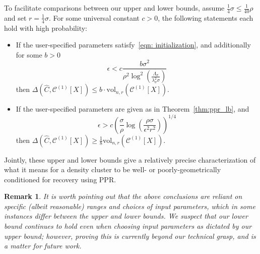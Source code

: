 \documentclass[11pt,twoside]{article}
\newtheorem*{remark}{Remark}
\newcommand{\vol}{\mathrm{vol}}
\newcommand{\1}{\mathbf{1}}
\newcommand{\Xbf}{X}             %
\begin{document}
To facilitate comparisons between our upper and lower bounds, assume $\frac{1}{4}\sigma \leq \frac{1}{40}\rho$ and set $r = \frac{1}{4}\sigma$. 
For some universal constant $c > 0$, the following statements each hold with high probability:
\begin{itemize}
	\item If the user-specified parameters satisfy~\eqref{eqn: initialization}, and additionally for some $b > 0$
	\begin{equation*}
	\epsilon < c\frac{b\sigma^2}{\rho^2 \log^2\left(\frac{\Lambda_{\sigma}}{\lambda_{\sigma}^2\sigma}\right)}
	\end{equation*}
	then $\Delta(\widehat{C}, \mathcal{C}^{(1)}[\Xbf]) \leq b \cdot  \vol_{n,r}(\mathcal{C}^{(1)}[\Xbf])$.
	\item If the user-specified parameters are given as in Theorem~\ref{thm:ppr_lb}, and 
	\begin{equation*}
	\epsilon > c\left({\frac{\sigma}{\rho}} \log\left(\frac{\rho \sigma}{\epsilon^2 r^2}\right)\right)^{1/4}
	\end{equation*}
	then $\Delta(\widehat{C}, \mathcal{C}^{(1)}[\Xbf]) \geq \frac{1}{8} \vol_{n,r}(\mathcal{C}^{(1)}[\Xbf])$.
\end{itemize}

Jointly, these upper and lower bounds give a relatively precise characterization of what it means for a density cluster to be well- or poorly-geometrically conditioned for recovery using PPR.

\begin{remark}
	It is worth pointing out that the above conclusions are reliant on specific (albeit reasonable) ranges and choices of input parameters, which in some instances differ between the upper and lower bounds. We suspect that our lower bound continues to hold even when choosing input parameters as dictated by our upper bound; however, proving this is currently beyond our technical grasp, and is a matter for future work. 
\end{remark}
\end{document}
